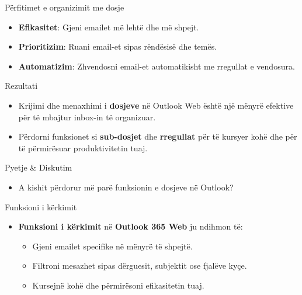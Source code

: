 \documentclass[
  ignorenonframetext,
]{beamer}
\providecommand{\tightlist}{%
  \setlength{\itemsep}{0pt}\setlength{\parskip}{0pt}}
\begin{document}
\begin{frame}{Përfitimet e organizimit me dosje}
\label{puxebrfitimet-e-organizimit-me-dosje}
\begin{itemize}
\item
  \textbf{Efikasitet}: Gjeni emailet më lehtë dhe më shpejt.
\item
  \textbf{Prioritizim}: Ruani email-et sipas rëndësisë dhe temës.
\item
  \textbf{Automatizim}: Zhvendosni email-et automatikisht me rregullat e
  vendosura.
\end{itemize}
\end{frame}

\begin{frame}{Rezultati}
\label{rezultati-1}
\begin{itemize}
\item
  Krijimi dhe menaxhimi i \textbf{dosjeve} në Outlook Web është një
  mënyrë efektive për të mbajtur inbox-in të organizuar.
\item
  Përdorni funksionet si \textbf{sub-dosjet} dhe \textbf{rregullat} për
  të kursyer kohë dhe për të përmirësuar produktivitetin tuaj.
\end{itemize}
\end{frame}

\begin{frame}{Pyetje \& Diskutim}
\label{pyetje-diskutim-2}
\begin{itemize}
\tightlist
\item
  A kishit përdorur më parë funksionin e dosjeve në Outlook?
\end{itemize}
\end{frame}

\begin{frame}{Funksioni i kërkimit}
\label{funksioni-i-kuxebrkimit}
\begin{itemize}
\item
  \textbf{Funksioni i kërkimit} në \textbf{Outlook 365 Web} ju ndihmon
  të:

  \begin{itemize}
  \item
    Gjeni emailet specifike në mënyrë të shpejtë.
  \item
    Filtroni mesazhet sipas dërguesit, subjektit ose fjalëve kyçe.
  \item
    Kursejnë kohë dhe përmirësoni efikasitetin tuaj.
  \end{itemize}
\end{itemize}
\end{frame}
\end{document}
